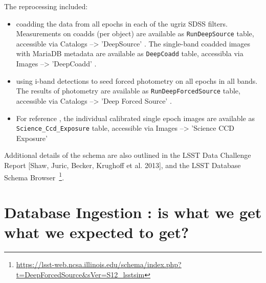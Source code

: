 \documentclass[fleqn,usenatbib]{mnras} %
\begin{document}
The reprocessing included: 
\begin{itemize}
\item coadding the data from all epochs in each of the ugriz SDSS filters. Measurements on coadds (per object) are available as  \verb|RunDeepSource| table, accessible via Catalogs -->   'DeepSource' .  The single-band coadded images with MariaDB metadata are available as \verb|DeepCoadd| table, accessibla via Images -->  'DeepCoadd' . 
\item using i-band detections to seed forced photometry on all epochs in all bands. The results of photometry are available as \verb|RunDeepForcedSource| table, accessible via  Catalogs --> 'Deep Forced Source' .  
\item For reference , the individual calibrated single epoch images are available as \verb|Science_Ccd_Exposure| table, accessible via Images --> 'Science CCD Exposure'   
\end{itemize}

Additional details of the schema are also outlined in the LSST Data Challenge Report [Shaw, Juric, Becker, Krughoff et al. 2013], and the LSST Database Schema Browser~\footnote{\url{https://lsst-web.ncsa.illinois.edu/schema/index.php?t=DeepForcedSource&sVer=S12_lsstsim}}. 



\section{Database Ingestion : is what we get what we expected to get? }
\label{sec:dg}


\end{document}
